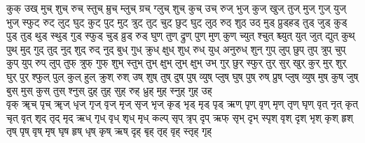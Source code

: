 {	कुक् उख् मुच् शुच् रुच् स्तुच् म्रुच् म्लुच् ग्रच् ग्लुच् शुच् कुच् उच् रुज् भुज् कुज् खुज् तुज् मुज् गुज् युज् भुज् स्फुट् रुट् लुट् घुट् कुट् पुट् मुट् त्रुट् तुट् चुट् छुट् घुट्  लुठ् रुठ् शुठ् उठ् मुड् प्रुड्हड् तुड् जुड् कुड् पुड् तुड् थुड् स्थुड् गुड् स्फुड् चुड् व्रुड् रुड् घुण् तुण् द्रुण् पुण् मुण् कुण् च्युत् श्चुत् श्च्युत् युत् जुत् द्युत् कुथ् पुथ् मुद् गुद् तुद् नुद् शुद् रुद् नुद् बुध् गुध् क्रुध् क्षुध् शुध् रुध् युध् अनुरुध् शुन् गुप् लुप् छुप् तुप् त्रुप् चुप् कुप् युप् रुप् लुप् तुफ् त्रुफ् गुफ् शुभ् स्तुभ् तुभ् क्षुभ् लुभ् क्षुभ् उभ् गुर् छुर् स्फुर् तुर् सुर् खुर् कुर् मुर् शुर् घुर् पुर् श्फुल् पुल् कुल् हुल् क्रुश् रुश् उष् शुष् तुष् दुष् पुष् व्युष् प्लुष् घुष् पुष् रुष् प्रुष् प्लुष् व्युष् मुष् कुष् जुष् बुस् मुस् कुस् तुस् श्नुस् दुह् तुह् सुह् रुह् ध्रुह् मुह् स्नुह् गुह् उह् \\
	वृक् ॠच् पृच् ॠज् धृज् गृज् वृज् मृज् सृज् भृज् कृड् भृड् मृड् पृड् ऋण् पृण् वृण् मृण् तृण् घृण् वृत् नृत् कृत् चृत् वृत् शृद् तृद् मृद् ऋध् गृध् वृध् शृध् मृध् कल्प् सृप् त्रृप् दृप् ऋफ् सृभ् दृभ् स्पृश् वृश् दृश् भृश् कृश् हृश् तृष् पृष् वृष् मृष् घृष हृष् धृष् कृष् ऋष् दृह् बृह् तृह् वृह् स्तृह् गृह् \\
}
